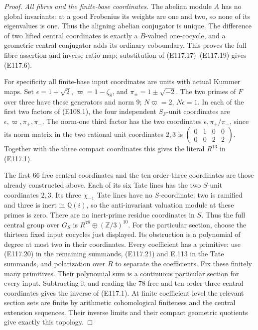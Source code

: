 \begin{proof}
\emph{All fibres and the finite-base coordinates.}
The abelian module $A$ has no global invariants: at a good
Frobenius its weights are one and two, so none of its
eigenvalues is one.  Thus the aligning abelian conjugator
is unique.  The difference of two lifted central coordinates
is exactly a $B$-valued one-cocycle, and a geometric central
conjugator adds its ordinary coboundary.
This proves the full fibre assertion and inverse ratio map;
substitution of (E117.17)--(E117.19) gives (E117.6).

For specificity all finite-base input coordinates are units
with actual Kummer maps.  Set $\epsilon=1+\sqrt2$,
$\varpi=1-\zeta_8$, and $\pi_\pm=1\pm\sqrt{-2}$.
The two primes of $F$ over three have these generators and
norm $9$; $N\varpi=2$, $N\epsilon=1$.
In each of the first two factors of (E108.1), the four
independent $S_F$-unit coordinates are
$\epsilon,\varpi,\pi_+,\pi_-$.
The norm-one third factor has the two coordinates
$\epsilon,\pi_+/\pi_-$, since its norm matrix in the
two rational unit coordinates $2,3$ is
$\left(\begin{smallmatrix}0&1&0&0\\0&0&2&2\end{smallmatrix}\right)$.
Together with the three compact coordinates this gives the
literal $R^{13}$ in (E117.1).

The first $66$ free central coordinates and the ten order-three
coordinates are those already constructed above.
Each of its six Tate lines has the two $S$-unit coordinates
$2,3$.  Its three $\chi_{-1}$ Tate lines have no $S$-coordinate:
two is ramified and three is inert in $\mathbb Q(i)$, so the
anti-invariant valuation module at these primes is zero.
There are no inert-prime residue coordinates in $S$.
Thus the full central group over $G_S$ is
$R^{78}\oplus(\mathbb Z/3)^{10}$.
For the particular section, choose the thirteen fixed
input cocycles just displayed.  Its obstruction is a polynomial
of degree at most two in their coordinates.  Every coefficient
has a primitive: use (E117.20) in the remaining summands,
(E117.21) and E.113 in the Tate summands, and polarization
over $R$ to separate the coefficients.  Fix these finitely
many primitives.  Their polynomial sum is a continuous
particular section for every input.
Subtracting it and reading the $78$ free and ten order-three central coordinates gives
the inverse of (E117.1).
At finite coefficient level the relevant section sets are
finite by arithmetic cohomological finiteness and the central
extension sequences.  Their inverse limits and their compact
geometric quotients give exactly this topology.


\end{proof}
